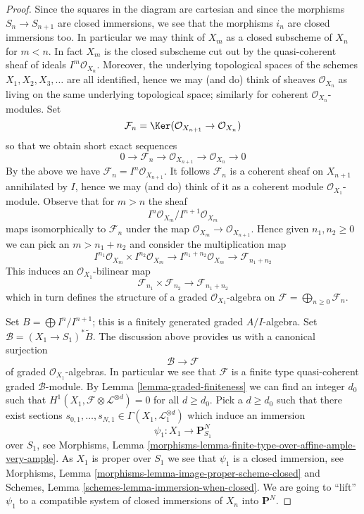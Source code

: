 \begin{proof}
Since the squares in the diagram are cartesian and since the morphisms
$S_n \to S_{n + 1}$ are closed immersions, we see that the morphisms
$i_n$ are closed immersions too. In particular we may think of
$X_m$ as a closed subscheme of $X_n$ for $m < n$. In fact $X_m$ is
the closed subscheme cut out by the quasi-coherent sheaf of ideals
$I^m\mathcal{O}_{X_n}$. Moreover, the underlying topological spaces
of the schemes $X_1, X_2, X_3, \ldots$ are all identified, hence we
may (and do) think of sheaves $\mathcal{O}_{X_n}$ as living on the
same underlying topological space; similarly for coherent
$\mathcal{O}_{X_n}$-modules. Set
$$
\mathcal{F}_n =
\Ker(\mathcal{O}_{X_{n + 1}} \to \mathcal{O}_{X_n})
$$
so that we obtain short exact sequences
$$
0 \to \mathcal{F}_n \to \mathcal{O}_{X_{n + 1}} \to \mathcal{O}_{X_n} \to 0
$$
By the above we have $\mathcal{F}_n = I^n\mathcal{O}_{X_{n + 1}}$.
It follows $\mathcal{F}_n$ is a coherent sheaf on $X_{n + 1}$
annihilated by $I$, hence we may (and do) think of it as a coherent
module $\mathcal{O}_{X_1}$-module. Observe that for $m > n$ the sheaf
$$
I^n\mathcal{O}_{X_m}/I^{n + 1}\mathcal{O}_{X_m}
$$
maps isomorphically to $\mathcal{F}_n$ under the map
$\mathcal{O}_{X_m} \to \mathcal{O}_{X_{n + 1}}$. Hence given
$n_1, n_2 \geq 0$ we can pick an $m > n_1 + n_2$ and consider the
multiplication map
$$
I^{n_1}\mathcal{O}_{X_m} \times I^{n_2}\mathcal{O}_{X_m}
\longrightarrow
I^{n_1 + n_2}\mathcal{O}_{X_m} \to \mathcal{F}_{n_1 + n_2}
$$
This induces an $\mathcal{O}_{X_1}$-bilinear map
$$
\mathcal{F}_{n_1} \times \mathcal{F}_{n_2} \longrightarrow
\mathcal{F}_{n_1 + n_2}
$$
which in turn defines the structure of a graded $\mathcal{O}_{X_1}$-algebra
on $\mathcal{F} = \bigoplus_{n \geq 0} \mathcal{F}_n$.

\medskip\noindent
Set $B = \bigoplus I^n/I^{n + 1}$; this is a finitely generated
graded $A/I$-algebra. Set $\mathcal{B} = (X_1 \to S_1)^*\widetilde{B}$.
The discussion above provides us with a canonical surjection
$$
\mathcal{B} \longrightarrow \mathcal{F}
$$
of graded $\mathcal{O}_{X_1}$-algebras. In particular we see that
$\mathcal{F}$ is a finite type quasi-coherent graded $\mathcal{B}$-module.
By Lemma \ref{lemma-graded-finiteness} we can find an integer $d_0$
such that $H^1(X_1, \mathcal{F} \otimes \mathcal{L}^{\otimes d}) = 0$
for all $d \geq d_0$. Pick a $d \geq d_0$ such that there exist sections
$s_{0, 1}, \ldots, s_{N, 1} \in \Gamma(X_1, \mathcal{L}_1^{\otimes d})$
which induce an immersion
$$
\psi_1 : X_1 \to \mathbf{P}^N_{S_1}
$$
over $S_1$, see
Morphisms, Lemma \ref{morphisms-lemma-finite-type-over-affine-ample-very-ample}.
As $X_1$ is proper over $S_1$ we see that $\psi_1$
is a closed immersion, see
Morphisms, Lemma \ref{morphisms-lemma-image-proper-scheme-closed}
and
Schemes, Lemma \ref{schemes-lemma-immersion-when-closed}.
We are going to ``lift'' $\psi_1$ to a compatible system of
closed immersions of $X_n$ into $\mathbf{P}^N$.


\end{proof}
